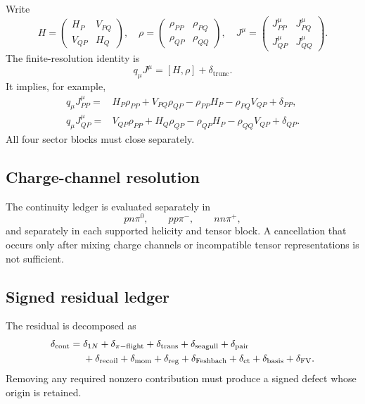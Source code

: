 \documentclass[11pt]{article}
\newcommand{\ct}{\mathrm{ct}}
\newcommand{\trunc}{\mathrm{trunc}}
\begin{document}
Write
\begin{equation}
 H=
 \begin{pmatrix}
 H_P & V_{PQ}\\
 V_{QP} & H_Q
 \end{pmatrix},
 \quad
 \rho=
 \begin{pmatrix}
 \rho_{PP} & \rho_{PQ}\\
 \rho_{QP} & \rho_{QQ}
 \end{pmatrix},
 \quad
 J^\mu=
 \begin{pmatrix}
 J_{PP}^\mu & J_{PQ}^\mu\\
 J_{QP}^\mu & J_{QQ}^\mu
 \end{pmatrix}.
 \label{eq:block-operators}
\end{equation}
The finite-resolution identity is
\begin{equation}
 q_\mu J^\mu=[H,\rho]+\delta_{\trunc}.
 \label{eq:continuity-master}
\end{equation}
It implies, for example,
\begin{align}
 q_\mu J_{PP}^\mu
 ={}&
 H_P\rho_{PP}+V_{PQ}\rho_{QP}
 -\rho_{PP}H_P-\rho_{PQ}V_{QP}
 +\delta_{PP},
 \label{eq:continuity-pp}\\
 q_\mu J_{QP}^\mu
 ={}&
 V_{QP}\rho_{PP}+H_Q\rho_{QP}
 -\rho_{QP}H_P-\rho_{QQ}V_{QP}
 +\delta_{QP}.
 \label{eq:continuity-qp}
\end{align}
All four sector blocks must close separately.

\subsection{Charge-channel resolution}

The continuity ledger is evaluated separately in
\begin{equation}
 pn\pi^0,
 \qquad
 pp\pi^-,
 \qquad
 nn\pi^+,
 \label{eq:charge-channels}
\end{equation}
and separately in each supported helicity and tensor block.  A cancellation
that occurs only after mixing charge channels or incompatible tensor
representations is not sufficient.

\subsection{Signed residual ledger}

The residual is decomposed as
\begin{align}
 \delta_{\mathrm{cont}}={}&
 \delta_{1N}+\delta_{\pi\mathrm{-flight}}
 +\delta_{\mathrm{trans}}+\delta_{\mathrm{seagull}}
 +\delta_{\mathrm{pair}}
 \notag\\
 &+\delta_{\mathrm{recoil}}
 +\delta_{\mathrm{mom}}
 +\delta_{\mathrm{reg}}
 +\delta_{\mathrm{Feshbach}}
 +\delta_{\ct}
 +\delta_{\mathrm{basis}}
 +\delta_{\mathrm{FV}}.
 \label{eq:continuity-ledger}
\end{align}
Removing any required nonzero contribution must produce a signed defect whose
origin is retained.
\end{document}
